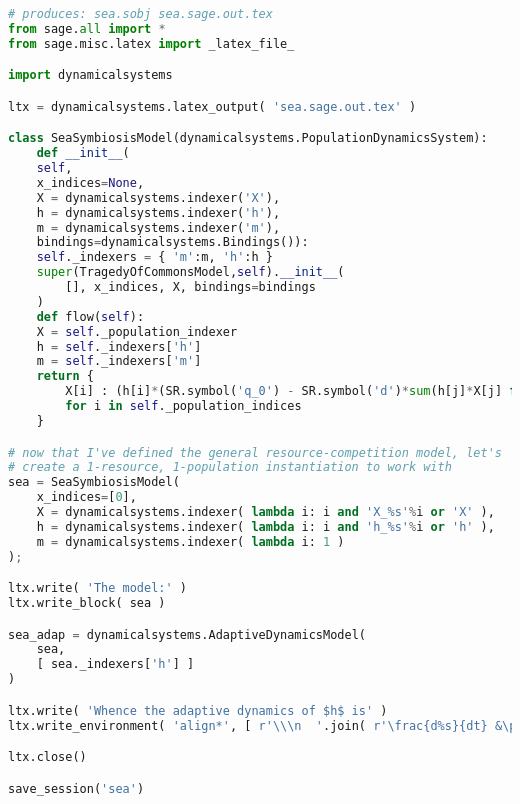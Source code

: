 \begin{lstlisting}[language=Python]
# produces: sea.sobj sea.sage.out.tex
from sage.all import * 
from sage.misc.latex import _latex_file_

import dynamicalsystems

ltx = dynamicalsystems.latex_output( 'sea.sage.out.tex' )

class SeaSymbiosisModel(dynamicalsystems.PopulationDynamicsSystem):
    def __init__(
	self,
	x_indices=None,
	X = dynamicalsystems.indexer('X'),
	h = dynamicalsystems.indexer('h'),
	m = dynamicalsystems.indexer('m'),
	bindings=dynamicalsystems.Bindings()):
	self._indexers = { 'm':m, 'h':h }
	super(TragedyOfCommonsModel,self).__init__(
	    [], x_indices, X, bindings=bindings
	)
    def flow(self):
	X = self._population_indexer
	h = self._indexers['h']
	m = self._indexers['m']
	return {
	    X[i] : (h[i]*(SR.symbol('q_0') - SR.symbol('d')*sum(h[j]*X[j] for j in self._population_indices)) - m[i]) * X[i]
	    for i in self._population_indices
	}

# now that I've defined the general resource-competition model, let's
# create a 1-resource, 1-population instantiation to work with
sea = SeaSymbiosisModel(
    x_indices=[0],
    X = dynamicalsystems.indexer( lambda i: i and 'X_%s'%i or 'X' ),
    h = dynamicalsystems.indexer( lambda i: i and 'h_%s'%i or 'h' ),
    m = dynamicalsystems.indexer( lambda i: 1 )
);

ltx.write( 'The model:' )
ltx.write_block( sea )

sea_adap = dynamicalsystems.AdaptiveDynamicsModel( 
    sea,
    [ sea._indexers['h'] ]
)

ltx.write( 'Whence the adaptive dynamics of $h$ is' )
ltx.write_environment( 'align*', [ r'\\\n  '.join( r'\frac{d%s}{dt} &\propto %s' % (latex(v), latex(sea_adap._S[v])) for v in sea_adap._vars ) ] )

ltx.close()

save_session('sea')
\end{lstlisting}
